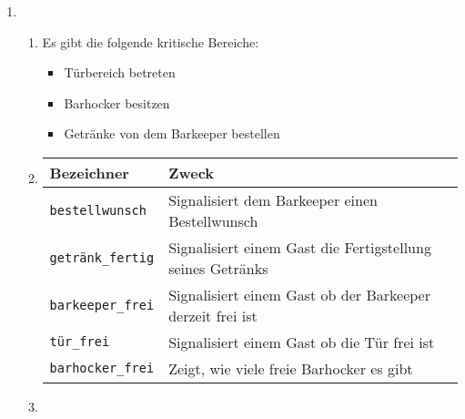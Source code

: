 \begin{enumerate}[label={Aufgabe H\arabic*},start=45]
    \item 
        \begin{enumerate}
            \makeatletter
                \setlength{\leftmargins}{\@totalleftmargin}
            \makeatother

            \item Es gibt die folgende kritische Bereiche:
                \begin{itemize}
                    \item Türbereich betreten
                    \item Barhocker besitzen
                    \item Getränke von dem Barkeeper bestellen
                \end{itemize}
            \item \blanko
                \vspace{-1em}
                \begin{center}
                    \small
                    \begin{tabularx}{0.85\textwidth}{p{3cm}X}
                        \toprule
                        Bezeichner & Zweck \\
                        \midrule
                        \texttt{bestellwunsch} & Signalisiert dem Barkeeper einen Bestellwunsch\\
                        \texttt{getränk\_fertig} & Signalisiert einem Gast die Fertigstellung seines Getränks \\
                        \texttt{barkeeper\_frei} & Signalisiert einem Gast ob der Barkeeper derzeit frei ist \\
                        \texttt{tür\_frei} & Signalisiert einem Gast ob die Tür frei ist \\
                        \texttt{barhocker\_frei} & Zeigt, wie viele freie Barhocker es gibt \\
                        \bottomrule
                    \end{tabularx}
                \end{center}
                \vspace{\baselineskip}
            \item \blanko
                \vspace{-1em}
                \begin{center}
                    \small
                    \begin{tabularx}{0.85\textwidth}{p{4.5cm}X}

\end{tabularx}
\end{center}
\end{enumerate}
\end{enumerate}
